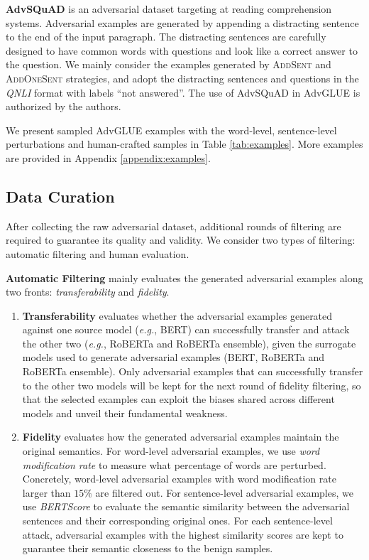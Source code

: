 \documentclass{article}
\newcommand{\method}{AdvGLUE\xspace}
\begin{document}
\textbf{AdvSQuAD} \citep{advsquad} is an adversarial dataset targeting at reading comprehension systems. Adversarial examples are generated by appending a distracting sentence to the end of the input paragraph. The distracting sentences are carefully designed to have common words with questions and look like a correct answer to the question.
We mainly consider the examples generated by \textsc{AddSent} and \textsc{AddOneSent} strategies, and adopt the distracting sentences and questions in the \textit{QNLI} format with labels ``not answered''.
The use of AdvSQuAD in \method is authorized by the authors.

We present sampled \method examples with the word-level, sentence-level perturbations and human-crafted samples in Table \ref{tab:examples}. More examples are provided in  Appendix \ref{appendix:examples}.

\subsection{Data Curation}
After collecting the raw adversarial dataset, additional rounds of filtering are required to guarantee its quality and validity. We consider two types of filtering: automatic filtering and human evaluation. 

\textbf{Automatic Filtering} mainly evaluates the generated adversarial examples along two fronts: \textit{transferability} and \textit{fidelity}.
\begin{enumerate}[leftmargin=*]
\item \textbf{Transferability} evaluates whether the adversarial examples generated against one source model (\emph{e.g.}, BERT) can successfully transfer and attack the other two (\emph{e.g.}, RoBERTa and RoBERTa ensemble), given the surrogate models used to generate adversarial examples (BERT, RoBERTa and RoBERTa ensemble).
Only  adversarial examples that can successfully transfer to the other two models will be kept for the next round of fidelity filtering, so that the selected examples can exploit the biases shared across different models and unveil their fundamental  weakness.
\item \textbf{Fidelity} evaluates how the generated adversarial examples maintain the original semantics. For word-level adversarial examples, we use \textit{word modification rate} to measure what percentage of words are perturbed. Concretely, word-level adversarial examples with word modification rate larger than $15\%$ are filtered out. 
For sentence-level adversarial examples, we use \textit{BERTScore} \citep{bertscore} to evaluate the semantic similarity between the adversarial sentences and their corresponding original ones. For each sentence-level attack, adversarial examples with the highest similarity scores are kept to guarantee their semantic closeness to the benign samples.
\end{enumerate}
\end{document}
